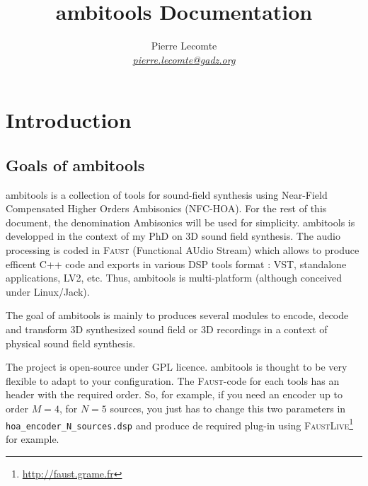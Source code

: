 \documentclass[10pt,a4paper]{article}
\author{Pierre Lecomte \\ \textit{ \href{mailto:pierre.lecomte@gadz.org}{pierre.lecomte@gadz.org}}}
\title{ambitools Documentation}
\begin{document}

\makeatletter
\newcommand\footnoteref[1]{\protected@xdef\@thefnmark{\ref{#1}}\@footnotemark}
\makeatother

\maketitle
\tableofcontents
\section{Introduction}

\subsection{Goals of ambitools}
ambitools is a collection of tools for sound-field synthesis using Near-Field Compensated Higher Orders Ambisonics (NFC-HOA). For the rest of this document, the denomination Ambisonics will be used for simplicity.
ambitools is developped in the context of my PhD on 3D sound field synthesis. The audio processing is coded in \textsc{Faust}\footnoteref{faustlive} (Functional AUdio Stream) which allows to produce efficent C++ code and exports in various DSP tools format : VST, standalone applications, LV2, etc. Thus, ambitools is multi-platform (although conceived under Linux/Jack).

The goal of ambitools is mainly to produces several modules to encode, decode and transform 3D synthesized sound field or 3D recordings in a context of physical sound field synthesis. 

The project is open-source under GPL licence. ambitools is thought to be very flexible to adapt to your configuration. The \textsc{Faust}-code for each tools has an header with the required order. So, for example, if you need an encoder up to order $M=4$, for $N=5$ sources, you just has to change this two parameters in \lstinline'hoa_encoder_N_sources.dsp' and produce de required plug-in using \textsc{FaustLive}\footnote{\label{faustlive}\url{http://faust.grame.fr}} for example.
\end{document}
